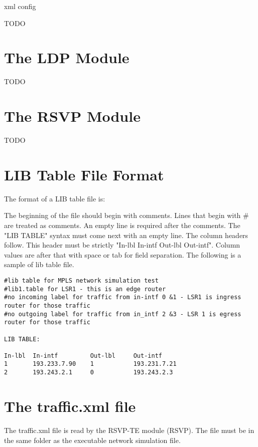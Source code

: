 xml config

TODO

\section{The LDP Module}


TODO

\section{The RSVP Module}


TODO

\section{LIB Table File Format}

The format of a LIB table file is:

The beginning of the file should begin with comments. Lines that begin with \# are treated
as comments. An empty line is required after the comments. The "LIB TABLE"
syntax must come next with an empty line. The column headers follow. This header
must be strictly "In-lbl In-intf Out-lbl Out-intf". Column
values are after that with space or tab for field separation.
The following is a sample of lib table file.

\begin{verbatim}
#lib table for MPLS network simulation test
#lib1.table for LSR1 - this is an edge router
#no incoming label for traffic from in-intf 0 &1 - LSR1 is ingress router for those traffic
#no outgoing label for traffic from in_intf 2 &3 - LSR 1 is egress router for those traffic

LIB TABLE:

In-lbl  In-intf         Out-lbl     Out-intf
1       193.233.7.90    1           193.231.7.21
2       193.243.2.1     0           193.243.2.3
\end{verbatim}


\section{The traffic.xml file}

The traffic.xml file is read by the RSVP-TE module (RSVP).
The file must be in the same folder as the executable
network simulation file.

